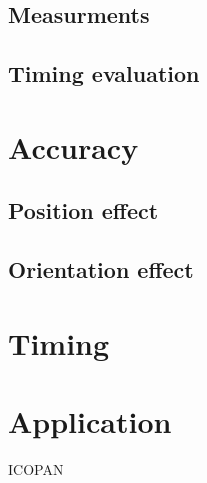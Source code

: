 \documentclass{InsightArticle}
\begin{document}
\subsection{Measurments}
\subsection{Timing evaluation}


\section{Accuracy}
\subsection{Position effect}
\subsection{Orientation effect}


\section{Timing}

\section{Application}

ICOPAN


\appendix





\nocite{ITKSoftwareGuide}
\end{document}
